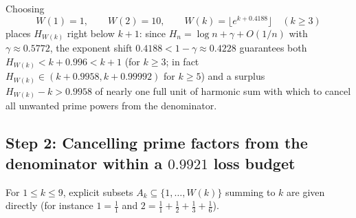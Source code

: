 \documentclass[11pt,a4paper]{amsart}
\theoremstyle{remark}
\begin{document}
Choosing
\[
W(1) = 1, \qquad W(2) = 10, \qquad W(k) = \lfloor e^{k + 0.4188} \rfloor \quad (k \ge 3)
\]
places $H_{W(k)}$ right below $k + 1$: since $H_n = \log n + \gamma + O(1/n)$ with $\gamma \approx 0.5772$, the exponent shift $0.4188 < 1 - \gamma \approx 0.4228$ guarantees both $H_{W(k)} < k + 0.996 < k + 1$ (for $k \ge 3$; in fact $H_{W(k)} \in (k + 0.9958, k + 0.99992)$ for $k \ge 5$) and a surplus $H_{W(k)} - k > 0.9958$ of nearly one full unit of harmonic sum with which to cancel all unwanted prime powers from the denominator.

\subsection*{\texorpdfstring{Step 2: Cancelling prime factors from the denominator within a $0.9921$ loss budget}{Step 2: Cancelling prime factors from the denominator within a 0.9921 loss budget}}
For $1 \le k \le 9$, explicit subsets $A_k \subseteq \{1, \dots, W(k)\}$ summing to $k$ are given directly (for instance $1 = \frac{1}{1}$ and $2 = \frac{1}{1} + \frac{1}{2} + \frac{1}{3} + \frac{1}{6}$).
\end{document}
